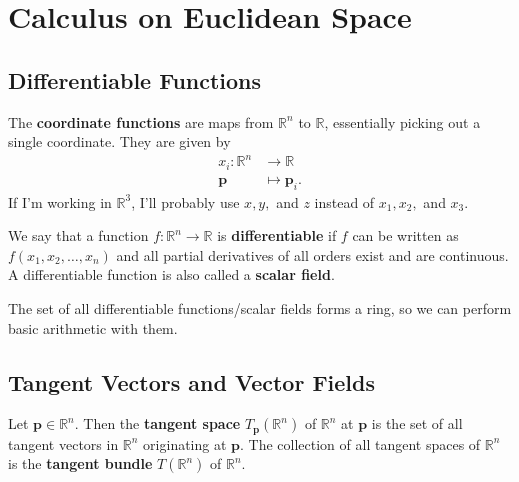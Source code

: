 \documentclass[10pt]{report}
\begin{document}
\tableofcontents


\chapter{Calculus on Euclidean Space}


\section{Differentiable Functions}

The \textbf{coordinate functions} are maps from $\mathbb{R}^n$ to $\mathbb{R}$, essentially picking out a single coordinate. They are given by
\begin{align*}
	x_i : \mathbb{R}^n &\to \mathbb{R} \\
	\mathbf{p}&\mapsto \mathbf{p}_i.
\end{align*}
If I'm working in $\mathbb{R}^3$, I'll probably use $x,y,$ and $z$ instead of $x_1, x_2,$ and $x_3$.

We say that a function $f:\mathbb{R}^n \to \mathbb{R}$ is \textbf{differentiable} if $f$ can be written as $f(x_1, x_2, \dots, x_n)$ and all partial derivatives of all orders exist and are continuous. A differentiable function is also called a \textbf{scalar field}.

The set of all differentiable functions/scalar fields forms a ring, so we can perform basic arithmetic with them.



\section{Tangent Vectors and Vector Fields}

\begin{defn}
	Let $\mathbf{p} \in \mathbb{R}^n$. Then the \textbf{tangent space} $T_\mathbf{p}(\mathbb{R}^n)$ of $\mathbb{R}^n$ at $\mathbf{p}$ is the set of all tangent vectors in $\mathbb{R}^n$ originating at $\mathbf{p}$. The collection of all tangent spaces of $\mathbb{R}^n$ is the \textbf{tangent bundle} $T(\mathbb{R}^n)$ of $\mathbb{R}^n$.
\end{defn}
\end{document}
